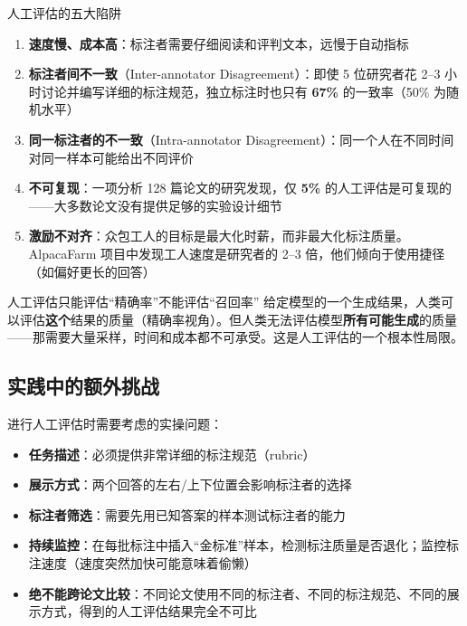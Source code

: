 \documentclass[a4paper]{article}
\begin{document}
\begin{warningbox}{人工评估的五大陷阱}
\begin{enumerate}
    \item \textbf{速度慢、成本高}：标注者需要仔细阅读和评判文本，远慢于自动指标
    \item \textbf{标注者间不一致}（Inter-annotator Disagreement）：即使 5 位研究者花 2--3 小时讨论并编写详细的标注规范，独立标注时也只有 \textbf{67\%} 的一致率（50\% 为随机水平）
    \item \textbf{同一标注者的不一致}（Intra-annotator Disagreement）：同一个人在不同时间对同一样本可能给出不同评价
    \item \textbf{不可复现}：一项分析 128 篇论文的研究发现，仅 \textbf{5\%} 的人工评估是可复现的——大多数论文没有提供足够的实验设计细节
    \item \textbf{激励不对齐}：众包工人的目标是最大化时薪，而非最大化标注质量。AlpacaFarm 项目中发现工人速度是研究者的 2--3 倍，他们倾向于使用捷径（如偏好更长的回答）
\end{enumerate}
\end{warningbox}

\begin{knowledgebox}{人工评估只能评估``精确率''不能评估``召回率''}
给定模型的一个生成结果，人类可以评估\textbf{这个}结果的质量（精确率视角）。但人类无法评估模型\textbf{所有可能生成}的质量——那需要大量采样，时间和成本都不可承受。这是人工评估的一个根本性局限。
\end{knowledgebox}

\subsection{实践中的额外挑战}

进行人工评估时需要考虑的实操问题：

\begin{itemize}
    \item \textbf{任务描述}：必须提供非常详细的标注规范（rubric）
    \item \textbf{展示方式}：两个回答的左右/上下位置会影响标注者的选择
    \item \textbf{标注者筛选}：需要先用已知答案的样本测试标注者的能力
    \item \textbf{持续监控}：在每批标注中插入``金标准''样本，检测标注质量是否退化；监控标注速度（速度突然加快可能意味着偷懒）
    \item \textbf{绝不能跨论文比较}：不同论文使用不同的标注者、不同的标注规范、不同的展示方式，得到的人工评估结果完全不可比
\end{itemize}
\end{document}
